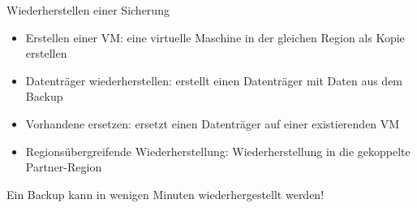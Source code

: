 \begin{flashcard}[Definition]{Wiederherstellen einer Sicherung}
    \begin{itemize}
        \item Erstellen einer VM: eine virtuelle Maschine in der gleichen Region als Kopie erstellen
        \item Datenträger wiederherstellen: erstellt einen Datenträger mit Daten aus dem Backup
        \item Vorhandene ersetzen: ersetzt einen Datenträger auf einer existierenden VM
        \item Regionsübergreifende Wiederherstellung: Wiederherstellung in die gekoppelte Partner-Region
    \end{itemize}
    Ein Backup kann in wenigen Minuten wiederhergestellt werden!
\end{flashcard}
